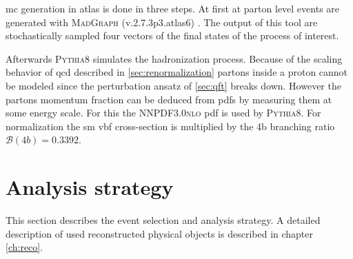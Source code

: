 \ac{mc} generation in \ac{atlas} is done in three steps. At first at parton level events are generated with \textsc{MadGraph} (v.2.7.3p3.atlas6) \citep{alwall2014automated}. The output of this tool are stochastically sampled four vectors of the final states of the process of interest.

Afterwards \textsc{Pythia8} \citep{Sjostrand:2014zea} simulates the hadronization process. Because of the scaling behavior of \ac{qcd} described in \ref{sec:renormalization} partons inside a proton cannot be modeled since the perturbation ansatz of \ref{sec:qft} breaks down. However the partons momentum fraction can be deduced from \acp{pdf} by measuring them at some energy scale. For this the \textsc{NNPDF3.0nlo} \ac{pdf} is used by \textsc{Pythia8}. For normalization the \ac{sm} \ac{vbf} cross-section is multiplied by the 4b branching ratio $\mathcal{B}(4b)=0.3392$.



\section{Analysis strategy}
This section describes the event selection and analysis strategy. A detailed description of used reconstructed physical objects is described in chapter \ref{ch:reco}.

